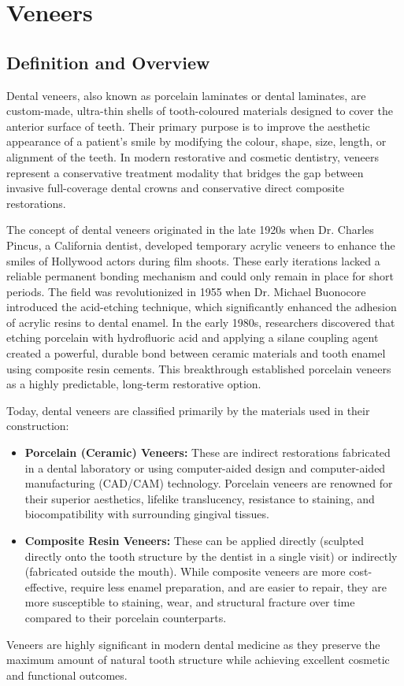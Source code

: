 \chapter{Veneers}

\section*{Definition and Overview}
Dental veneers, also known as porcelain laminates or dental laminates, are custom-made, ultra-thin shells of tooth-coloured materials designed to cover the anterior surface of teeth. Their primary purpose is to improve the aesthetic appearance of a patient's smile by modifying the colour, shape, size, length, or alignment of the teeth. In modern restorative and cosmetic dentistry, veneers represent a conservative treatment modality that bridges the gap between invasive full-coverage dental crowns and conservative direct composite restorations.

The concept of dental veneers originated in the late 1920s when Dr. Charles Pincus, a California dentist, developed temporary acrylic veneers to enhance the smiles of Hollywood actors during film shoots. These early iterations lacked a reliable permanent bonding mechanism and could only remain in place for short periods. The field was revolutionized in 1955 when Dr. Michael Buonocore introduced the acid-etching technique, which significantly enhanced the adhesion of acrylic resins to dental enamel. In the early 1980s, researchers discovered that etching porcelain with hydrofluoric acid and applying a silane coupling agent created a powerful, durable bond between ceramic materials and tooth enamel using composite resin cements. This breakthrough established porcelain veneers as a highly predictable, long-term restorative option.

Today, dental veneers are classified primarily by the materials used in their construction:
\begin{itemize}
    \item \textbf{Porcelain (Ceramic) Veneers:} These are indirect restorations fabricated in a dental laboratory or using computer-aided design and computer-aided manufacturing (CAD/CAM) technology. Porcelain veneers are renowned for their superior aesthetics, lifelike translucency, resistance to staining, and biocompatibility with surrounding gingival tissues.
    \item \textbf{Composite Resin Veneers:} These can be applied directly (sculpted directly onto the tooth structure by the dentist in a single visit) or indirectly (fabricated outside the mouth). While composite veneers are more cost-effective, require less enamel preparation, and are easier to repair, they are more susceptible to staining, wear, and structural fracture over time compared to their porcelain counterparts.
\end{itemize}
Veneers are highly significant in modern dental medicine as they preserve the maximum amount of natural tooth structure while achieving excellent cosmetic and functional outcomes.

